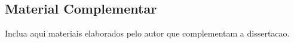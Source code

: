 \begin{apendicesenv}
\partapendices

\chapter{Material Complementar}

Inclua aqui materiais elaborados pelo autor que complementam a dissertacao.

\end{apendicesenv}
